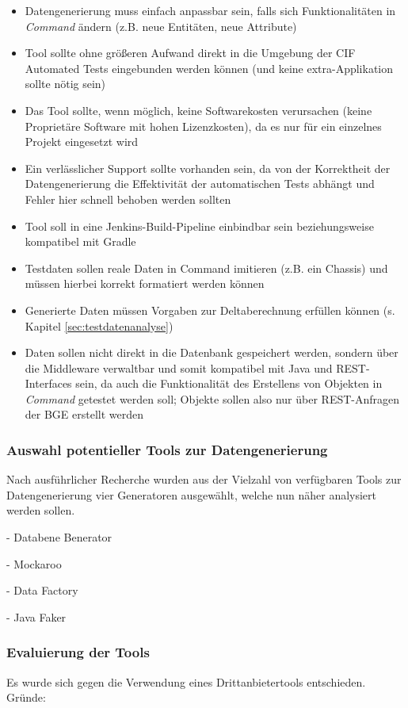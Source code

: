 \begin{itemize}
    \item Datengenerierung muss einfach anpassbar sein, falls sich Funktionalitäten in \textit{Command} ändern (z.B. neue Entitäten, neue Attribute)
    \item Tool sollte ohne größeren Aufwand direkt in die Umgebung der \ac{CIF} Automated Tests eingebunden werden können (und keine extra-Applikation sollte nötig sein)
    \item Das Tool sollte, wenn möglich, keine Softwarekosten verursachen (keine Proprietäre Software mit hohen Lizenzkosten), da es nur für ein einzelnes Projekt eingesetzt wird
    \item Ein verlässlicher Support sollte vorhanden sein, da von der Korrektheit der Datengenerierung die Effektivität der automatischen Tests abhängt und Fehler hier schnell behoben werden sollten
    \item Tool soll in eine Jenkins-Build-Pipeline einbindbar sein beziehungsweise kompatibel mit Gradle
    \item Testdaten sollen reale Daten in Command imitieren (z.B. ein Chassis) und müssen hierbei korrekt formatiert werden können
    \item Generierte Daten müssen Vorgaben zur Deltaberechnung erfüllen können (s. Kapitel \ref{sec:testdatenanalyse})
    \item Daten sollen nicht direkt in die Datenbank gespeichert werden, sondern über die Middleware verwaltbar und somit kompatibel mit Java und \ac{REST}-Interfaces sein, da auch die Funktionalität des Erstellens von Objekten in \textit{Command} getestet werden soll; Objekte sollen also nur über \ac{REST}-Anfragen der \ac{BGE} erstellt werden
\end{itemize}

\subsubsection*{Auswahl potentieller Tools zur Datengenerierung}\label{toolanalysauswahl}
Nach ausführlicher Recherche wurden aus der Vielzahl von verfügbaren Tools zur Datengenerierung vier Generatoren ausgewählt, welche nun näher analysiert werden sollen.

- Databene Benerator

- Mockaroo

- Data Factory

- Java Faker

\subsubsection*{Evaluierung der Tools}\label{toolanalysevaluierung}
Es wurde sich gegen die Verwendung eines Drittanbietertools entschieden. Gründe:

